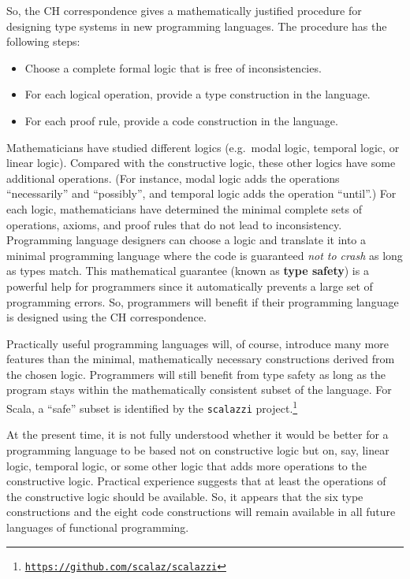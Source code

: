 So, the CH correspondence gives a mathematically justified procedure
for designing type systems in new programming languages. The procedure
has the following steps:
\begin{itemize}
\item Choose a complete formal logic that is free of inconsistencies.
\item For each logical operation, provide a type construction in the language.
\item For each proof rule, provide a code construction in the language.
\end{itemize}
Mathematicians have studied different logics (e.g.~modal logic, temporal
logic, or linear logic). Compared with the constructive logic, these
other logics have some additional operations. (For instance, modal
logic adds the operations ``necessarily'' and ``possibly'', and
temporal logic adds the operation ``until''.) For each logic, mathematicians
have determined the minimal complete sets of operations, axioms, and
proof rules that do not lead to inconsistency. Programming language
designers can choose a logic and translate it into a minimal programming
language where the code is guaranteed \emph{not to crash} as long
as types match. This mathematical guarantee (known as \textbf{type
safety}) is a powerful help for programmers since it automatically
prevents a large set of programming errors. So, programmers will benefit
if their programming language is designed using the CH correspondence.

Practically useful programming languages will, of course, introduce
many more features than the minimal, mathematically necessary constructions
derived from the chosen logic. Programmers will still benefit from
type safety as long as the program stays within the mathematically
consistent subset of the language. For Scala, a ``safe'' subset
is identified by the \texttt{scalazzi} project.\footnote{\texttt{\href{https://github.com/scalaz/scalazzi}{https://github.com/scalaz/scalazzi}}}

At the present time, it is not fully understood whether it would be
better for a programming language to be based not on constructive
logic but on, say, linear logic, temporal logic, or some other logic
that adds more operations to the constructive logic. Practical experience
suggests that at least the operations of the constructive logic should
be available. So, it appears that the six type constructions and the
eight code constructions will remain available in all future languages
of functional programming. 


